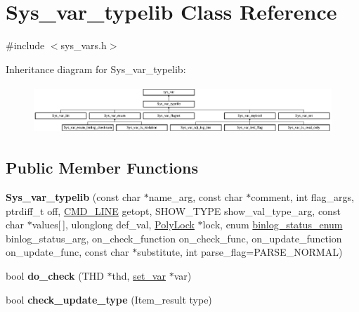 \hypertarget{classSys__var__typelib}{}\section{Sys\+\_\+var\+\_\+typelib Class Reference}
\label{classSys__var__typelib}


{\ttfamily \#include $<$sys\+\_\+vars.\+h$>$}

Inheritance diagram for Sys\+\_\+var\+\_\+typelib\+:\begin{figure}[H]
\begin{center}
\leavevmode
\includegraphics[height=1.794872cm]{classSys__var__typelib}
\end{center}
\end{figure}
\subsection*{Public Member Functions}
\begin{DoxyCompactItemize}
\item 
\mbox{\label{classSys__var__typelib_a45b634cea34dbf264a919c6963c9ed9d}} 
{\bfseries Sys\+\_\+var\+\_\+typelib} (const char $\ast$name\+\_\+arg, const char $\ast$comment, int flag\+\_\+args, ptrdiff\+\_\+t off, \mbox{\hyperlink{structCMD__LINE}{C\+M\+D\+\_\+\+L\+I\+NE}} getopt, S\+H\+O\+W\+\_\+\+T\+Y\+PE show\+\_\+val\+\_\+type\+\_\+arg, const char $\ast$values\mbox{[}$\,$\mbox{]}, ulonglong def\+\_\+val, \mbox{\hyperlink{classPolyLock}{Poly\+Lock}} $\ast$lock, enum \mbox{\hyperlink{classsys__var_a664520ec82191888717c86085bfa83ce}{binlog\+\_\+status\+\_\+enum}} binlog\+\_\+status\+\_\+arg, on\+\_\+check\+\_\+function on\+\_\+check\+\_\+func, on\+\_\+update\+\_\+function on\+\_\+update\+\_\+func, const char $\ast$substitute, int parse\+\_\+flag=P\+A\+R\+S\+E\+\_\+\+N\+O\+R\+M\+AL)
\item 
\mbox{\label{classSys__var__typelib_ad21851152d14449c9ad01792577ce02a}} 
bool {\bfseries do\+\_\+check} (T\+HD $\ast$thd, \mbox{\hyperlink{classset__var}{set\+\_\+var}} $\ast$var)
\item 
\mbox{\label{classSys__var__typelib_ac2268156dab06b8f6857658610dca859}} 
bool {\bfseries check\+\_\+update\+\_\+type} (Item\+\_\+result type)
\end{DoxyCompactItemize}
